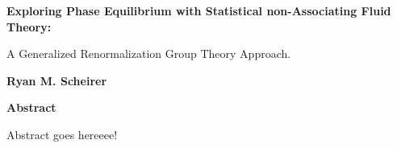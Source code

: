 \thispagestyle{plain}
\begin{center}
	\Large
	\textbf{Exploring Phase Equilibrium with Statistical non-Associating Fluid Theory:}
	
	\vspace{0.4cm}
	\large
	A Generalized Renormalization Group Theory Approach.
	
	\vspace{0.4cm}
	\textbf{Ryan M. Scheirer}
	
	\vspace{0.9cm}
	\textbf{Abstract}
\end{center}

Abstract goes hereeee!